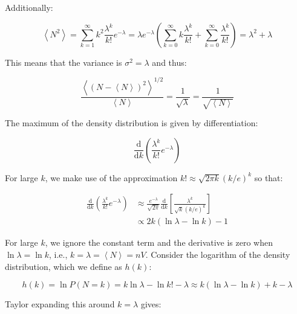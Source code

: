 \documentclass[12pt]{article}
\begin{document}
Additionally:

\begin{equation}
    \left\langle N^{2} \right\rangle = \sum_{k=1}^{\infty} k^{2} \frac{\lambda^{k}}{k!} e^{-\lambda} = \lambda e^{-\lambda} \left( \sum_{k=0}^{\infty} k \frac{\lambda^{k}}{k!} + \sum_{k=0}^{\infty} \frac{\lambda^{k}}{k!} \right) = \lambda^{2} + \lambda
\end{equation}

This means that the variance is $\sigma^{2} = \lambda$ and thus:

\begin{equation}
    \frac{\left\langle (N - \left\langle N \right\rangle)^{2} \right\rangle^{1/2}}{\left\langle N \right\rangle} = \frac{1}{\sqrt{\lambda}} = \frac{1}{\sqrt{\left\langle N \right\rangle}}
\end{equation}

The maximum of the density distribution is given by differentiation:

\begin{equation}
    \frac{\mathrm{d}}{\mathrm{d}k} \left( \frac{\lambda^{k}}{k!} e^{-\lambda} \right)
\end{equation}

For large $k$, we make use of the approximation $k! \approx \sqrt{2\pi k} (k/e)^{k}$ so that:

\begin{equation}
    \begin{split}
        \frac{\mathrm{d}}{\mathrm{d}k} \left( \frac{\lambda^{k}}{k!} e^{-\lambda} \right) &\approx \frac{e^{-\lambda}}{\sqrt{2\pi}} \frac{\mathrm{d}}{\mathrm{d}k} \left[ \frac{\lambda^{k}}{\sqrt{k} (k/e)^{k}} \right] \\
        &\propto 2k (\ln{\lambda} - \ln{k}) - 1
    \end{split}
\end{equation}

For large $k$, we ignore the constant term and the derivative is zero when $\ln{\lambda} = \ln{k}$, i.e., $k = \lambda = \left\langle N \right\rangle = nV$. Consider the logarithm of the density distribution, which we define as $h(k)$:

\begin{equation}
    h(k) = \ln{P(N = k)} = k \ln{\lambda} - \ln{k!} - \lambda \approx k (\ln{\lambda} - \ln{k}) + k - \lambda
\end{equation}

Taylor expanding this around $k = \lambda$ gives:
\end{document}
